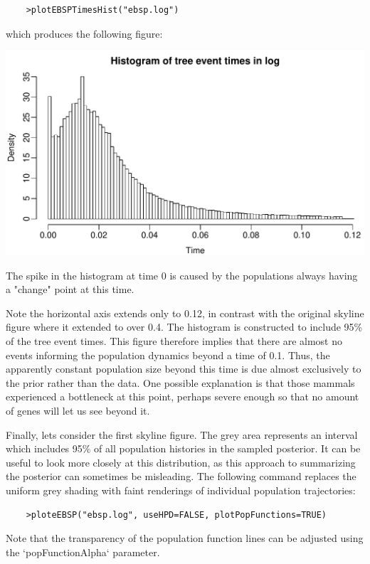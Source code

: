 \documentclass[a4paper,11pt]{article}
\begin{document}
\begin{verbatim}
    >plotEBSPTimesHist("ebsp.log")
\end{verbatim}

which produces the following figure:

\includegraphics[width=\textwidth]{figures/mysteryTimesHist.pdf}

The spike in the histogram at time 0 is caused by the populations always having
a "change" point at this time.

Note the horizontal axis extends only to 0.12, in contrast with the original
skyline figure where it extended to over 0.4.  The histogram is constructed to
include 95\% of the tree event times. This figure therefore implies that there
are almost no events informing the population dynamics beyond a time of 0.1.
Thus, the apparently constant population size beyond this time is due almost
exclusively to the prior rather than the data.  One possible explanation is
that those mammals experienced a bottleneck at this point, perhaps severe
enough so that no amount of genes will let us see beyond it.

Finally, lets consider the first skyline figure. The grey area represents an
interval which includes 95\% of all population histories in the sampled
posterior.  It can be useful to look more closely at this distribution, as this
approach to summarizing the posterior can sometimes be misleading.  The
following command replaces the uniform grey shading with faint renderings of
individual population trajectories:

\begin{verbatim}
    >ploteEBSP("ebsp.log", useHPD=FALSE, plotPopFunctions=TRUE)
\end{verbatim}

Note that the transparency of the population function lines can be adjusted
using the `popFunctionAlpha` parameter. 
\end{document}
